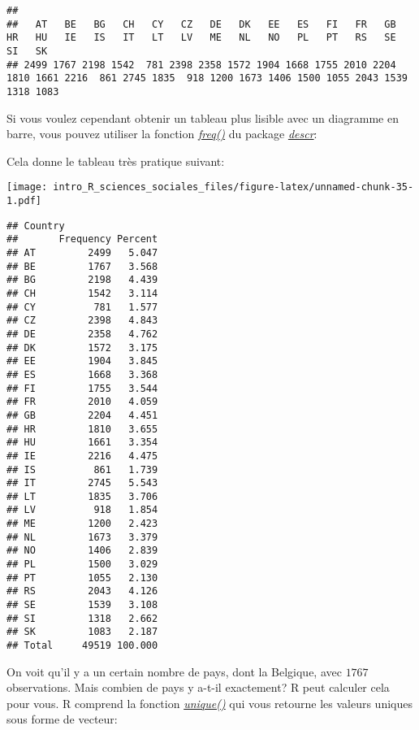 \documentclass[
]{book}
\newenvironment{Shaded}{\begin{snugshade}}{\end{snugshade}}
\newcommand{\FunctionTok}[1]{\textcolor[rgb]{0.00,0.00,0.00}{#1}}
\newcommand{\NormalTok}[1]{#1}
\newcommand{\SpecialCharTok}[1]{\textcolor[rgb]{0.00,0.00,0.00}{#1}}
\begin{document}
\begin{verbatim}
## 
##   AT   BE   BG   CH   CY   CZ   DE   DK   EE   ES   FI   FR   GB   HR   HU   IE   IS   IT   LT   LV   ME   NL   NO   PL   PT   RS   SE   SI   SK 
## 2499 1767 2198 1542  781 2398 2358 1572 1904 1668 1755 2010 2204 1810 1661 2216  861 2745 1835  918 1200 1673 1406 1500 1055 2043 1539 1318 1083
\end{verbatim}

Si vous voulez cependant obtenir un tableau plus lisible avec un diagramme en barre, vous pouvez utiliser la fonction \href{https://www.rdocumentation.org/packages/descr/versions/1.1.5/topics/freq}{\emph{freq()}} du package \href{https://cran.r-project.org/web/packages/descr/index.html}{\emph{descr}}:

\begin{Shaded}
\end{Shaded}

Cela donne le tableau très pratique suivant:

\texttt{[image: intro\_R\_sciences\_sociales\_files/figure-latex/unnamed-chunk-35-1.pdf]}

\begin{verbatim}
## Country 
##       Frequency Percent
## AT         2499   5.047
## BE         1767   3.568
## BG         2198   4.439
## CH         1542   3.114
## CY          781   1.577
## CZ         2398   4.843
## DE         2358   4.762
## DK         1572   3.175
## EE         1904   3.845
## ES         1668   3.368
## FI         1755   3.544
## FR         2010   4.059
## GB         2204   4.451
## HR         1810   3.655
## HU         1661   3.354
## IE         2216   4.475
## IS          861   1.739
## IT         2745   5.543
## LT         1835   3.706
## LV          918   1.854
## ME         1200   2.423
## NL         1673   3.379
## NO         1406   2.839
## PL         1500   3.029
## PT         1055   2.130
## RS         2043   4.126
## SE         1539   3.108
## SI         1318   2.662
## SK         1083   2.187
## Total     49519 100.000
\end{verbatim}

On voit qu'il y a un certain nombre de pays, dont la Belgique, avec \(1767\) observations. Mais combien de pays y a-t-il exactement? R peut calculer cela pour vous. R comprend la fonction \href{https://www.rdocumentation.org/packages/base/versions/3.6.2/topics/unique}{\emph{unique()}} qui vous retourne les valeurs uniques sous forme de vecteur:
\end{document}
